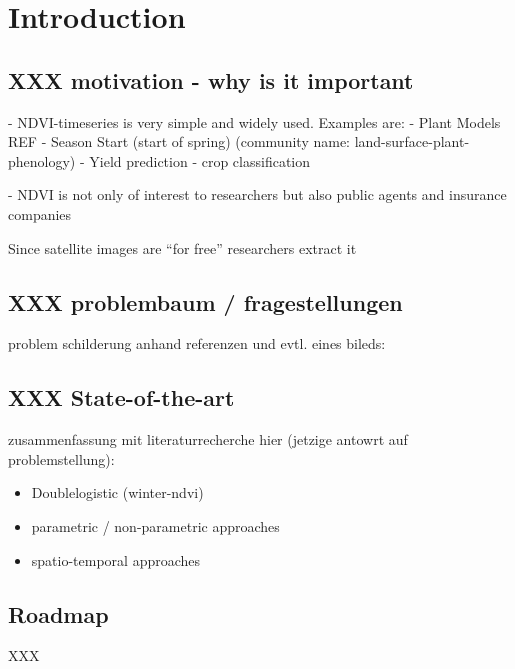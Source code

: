\chapter{Introduction}

\section{XXX motivation - why is it important}{
    - NDVI-timeseries is very simple and widely used. 
        Examples are: 
            - Plant Models REF
            - Season Start (start of spring) (community name: land-surface-plant-phenology)
            - Yield prediction
            - crop classification
    
    - NDVI is not only of interest to researchers but also public agents and insurance companies
    
    Since satellite images are ``for free'' researchers extract it
}


\section{XXX problembaum / fragestellungen}{
    problem schilderung anhand referenzen und evtl. eines bileds:
}



\section{XXX State-of-the-art}{
    zusammenfassung mit literaturrecherche hier (jetzige antowrt auf problemstellung):
    \begin{itemize}
        \item Doublelogistic (winter-ndvi)
        \item parametric / non-parametric approaches
        \item spatio-temporal approaches
    \end{itemize}
}


\section{Roadmap}{
    XXX
}

